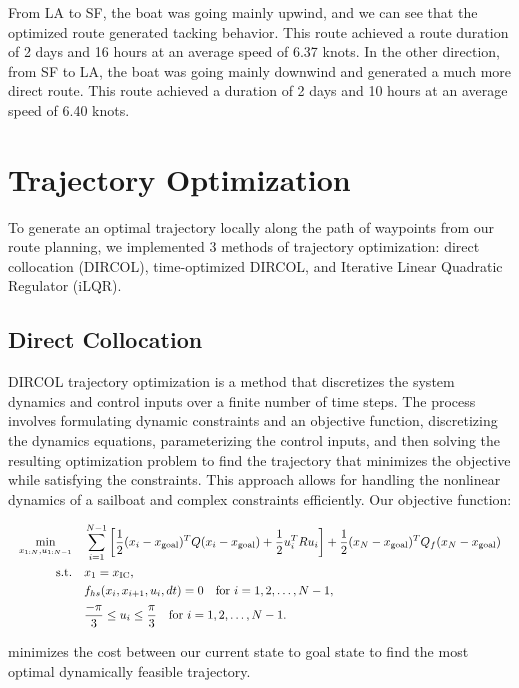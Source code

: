\documentclass[conference]{IEEEtran}
\begin{document}
From LA to SF, the boat was going mainly upwind, and we can see that the optimized route generated tacking behavior. This route achieved a route duration of 2 days and 16 hours at an average speed of 6.37 knots. In the other direction, from SF to LA, the boat was going mainly downwind and generated a much more direct route. This route achieved a duration of 2 days and 10 hours at an average speed of 6.40 knots.

\section{Trajectory Optimization}
\label{section:trajectory_optimization}
To generate an optimal trajectory locally along the path of waypoints from our route planning, we implemented 3 methods of trajectory optimization: direct collocation (DIRCOL), time-optimized DIRCOL, and Iterative Linear Quadratic Regulator (iLQR).
\subsection{Direct Collocation}
DIRCOL trajectory optimization is a method that discretizes the system dynamics and control inputs over a finite number of time steps. The process involves formulating dynamic constraints and an objective function, discretizing the dynamics equations, parameterizing the control inputs, and then solving the resulting optimization problem to find the trajectory that minimizes the objective while satisfying the constraints. This approach allows for handling the nonlinear dynamics of a sailboat and complex constraints efficiently. Our objective function:

\begin{equation}
\resizebox{\linewidth}{!}{$
\begin{aligned}
\min_{x_{1:N},u_{1:N-1}} \quad & \sum_{i=1}^{N-1} \bigg[ \frac{1}{2} (x_i - x_{\text{goal}})^TQ(x_i -x_{\text{goal}}) + \frac{1}{2} u_i^TRu_i \bigg] + \frac{1}{2}(x_N - x_{\text{goal}})^TQ_f(x_N -x_{\text{goal}}) \\ 
\text{s.t.} \quad & x_1 = x_{\text{IC}}, \\
& f_{hs}(x_i,x_{i+1},u_i,dt) = 0 \quad \text{for } i = 1,2,\ldots,N-1, \\
& \frac{-\pi}{3} \leq u_i \leq \frac{\pi}{3} \quad \text{for } i = 1,2,\ldots,N-1.
\end{aligned}
$}
\end{equation}

minimizes the cost between our current state to goal state to find the most optimal dynamically feasible trajectory.
\end{document}
